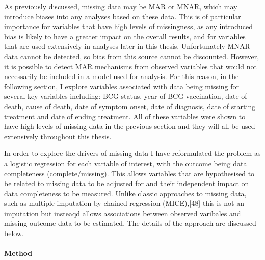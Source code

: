 \documentclass[11pt,twoside]{bristolthesis}
\begin{document}
  As previously discussed, missing data may be MAR or MNAR, which may introduce biases into any analyses based on these data. This is of particular importance for variables that have high levels of missingness, as any introduced bias is likely to have a greater impact on the overall results, and for variables that are used extensively in analyses later in this thesis. Unfortunately MNAR data cannot be detected, so bias from this source cannot be discounted. However, it is possible to detect MAR mechanisms from observed variables that would not necessarily be included in a model used for analysis. For this reason, in the following section, I explore variables associated with data being missing for several key variables including: BCG status, year of BCG vaccination, date of death, cause of death, date of symptom onset, date of diagnosis, date of starting treatment and date of ending treatment. All of these variables were shown to have high levels of missing data in the previous section and they will all be used extensively throughout this thesis.
  
  In order to explore the drivers of missing data I have reformulated the problem as a logistic regression for each variable of interest, with the outcome being data completeness (complete/missing). This allows variables that are hypothesised to be related to missing data to be adjusted for and their independent impact on data completeness to be measured. Unlike classic approaches to missing data, such as multiple imputation by chained regression (MICE),{[}48{]} this is not an imputation but insteaqd allows associations between observed varibales and missing outcome data to be estimated. The details of the approach are discussed below.
  
  \hypertarget{method}{%
  \paragraph{Method}\label{method}}
  
\end{document}
